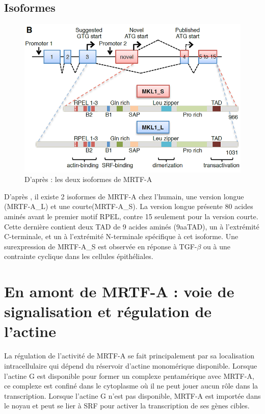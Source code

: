 \documentclass{report}
\begin{document}
 \subsection{Isoformes}
 \begin{figure}[h!]
 \includegraphics[scale=0.5]{MRTF_isoformes.png}
 \caption{D'après \cite{scharenberg_tgf-_2014} : les deux isoformes de MRTF-A}
 
 \end{figure}
 D'après \cite{scharenberg_tgf-_2014}, il existe 2 isoformes de MRTF-A chez l'humain, une version longue (MRTF-A\_L) et une courte(MRTF-A\_S). La version longue présente 80 acides aminés avant le premier motif RPEL, contre 15 seulement pour la version courte. Cette dernière contient deux TAD de 9 acides aminés (9aaTAD), un à l'extrémité C-terminale, et un à l'extrémité N-terminale spécifique à cet isoforme. Une surexpression de MRTF-A\_S est observée en réponse à TGF-$\beta$ ou à une contrainte cyclique dans les cellules épithéliales. 
 
 



\section{En amont de MRTF-A : voie de signalisation et régulation de l'actine} 


La régulation de l'activité de MRTF-A se fait principalement par sa localisation intracellulaire qui dépend du réservoir d'actine monomérique disponible. 
Lorsque l'actine G est disponible pour former un complexe pentamérique avec MRTF-A, ce complexe est confiné dans le cytoplasme où il ne peut jouer aucun rôle dans la transcription. 
Lorsque l'actine G n'est pas disponible, MRTF-A est importée dans le noyau et peut se lier à SRF pour activer la transcription de ses gènes cibles. 
\end{document}
